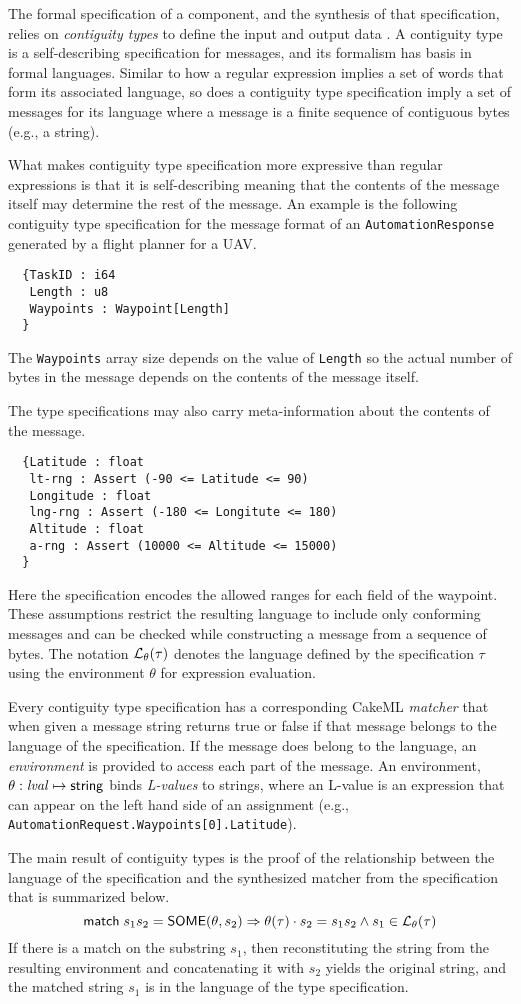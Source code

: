 The formal specification of a component, and the synthesis of that specification, relies on \emph{contiguity types} to define the input and output data \cite{contiguity-types} . 
A contiguity type is a self-describing specification for messages, and its formalism has basis in formal languages. 
Similar to how a regular expression implies a set of words that form its associated language, so does a contiguity type specification imply a set of messages for its language where a message is a finite sequence of contiguous bytes (e.g., a string). 

What makes contiguity type specification more expressive than regular expressions is that it is self-describing meaning that the contents of the message itself may determine the rest of the message. 
An example is the following contiguity type specification for the message format of an \texttt{AutomationResponse} generated by a flight planner for a UAV.
{\small
\begin{verbatim}
  {TaskID : i64
   Length : u8
   Waypoints : Waypoint[Length]
  }
\end{verbatim}
}
\noindent The \texttt{Waypoints} array size depends on the value of \texttt{Length} so the actual number of bytes in the message depends on the contents of the message itself. 

The type specifications may also carry meta-information about the contents of the message.
{\small
\begin{verbatim}
  {Latitude : float
   lt-rng : Assert (-90 <= Latitude <= 90) 
   Longitude : float
   lng-rng : Assert (-180 <= Longitute <= 180)
   Altitude : float
   a-rng : Assert (10000 <= Altitude <= 15000)
  }
\end{verbatim}
}
\noindent Here the specification encodes the allowed ranges for each field of the waypoint. These assumptions restrict the resulting language to include only conforming messages and can be checked while constructing a message from a sequence of bytes. The notation ${\mathcal L}_{\theta}({\tau})$ denotes the language defined by the specification $\tau$ using the environment $\theta$ for expression evaluation.

Every contiguity type specification has a corresponding CakeML \emph{matcher} that when given a message string returns true or false if that message belongs to the language of the specification. If the message does belong to the language, an \emph{environment} is provided to access each part of the message. An environment, $\theta: \mathit{lval} \mapsto \mathsf{string}$ binds \emph{L-values} to strings, where an L-value is an expression that can appear on the left hand side of an assignment (e.g., \texttt{AutomationRequest.Waypoints[0].Latitude}). 

The main result of contiguity types is the proof of the relationship between the language of the specification and the synthesized matcher from the specification that is summarized below.
\[
  \mathsf{match}\; s_1s_2 = \mathsf{SOME}(\theta, s_2)
  \Rightarrow \theta(\tau) \cdot s_2 = s_1s_2 \wedge s_1 \in {\mathcal L}_{\theta}({\tau})
\]
If there is a match on the substring $s_1$, then reconstituting the string from the resulting environment and concatenating it with $s_2$ yields the original string, and the matched string $s_1$ is in the language of the type specification.
